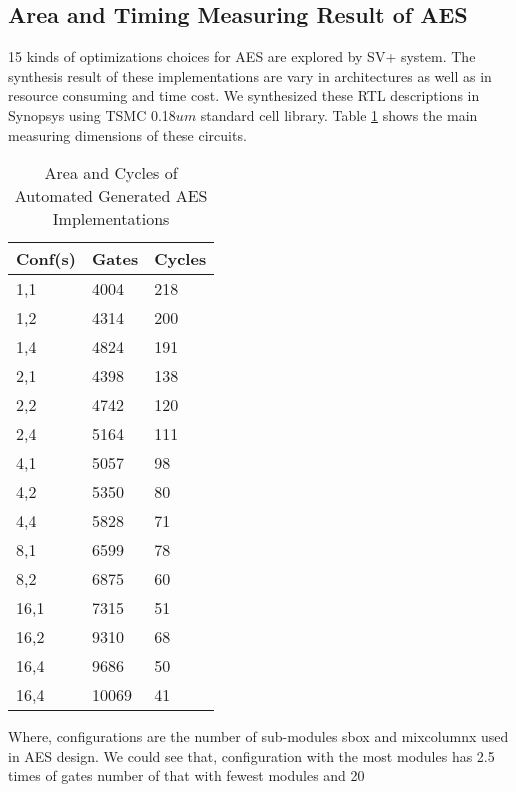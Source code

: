 \documentclass{acm_proc_article-sp}
\begin{document}
\subsection{Area and Timing Measuring Result of AES}
15 kinds of optimizations choices for AES\cite{AES} are explored by SV+ system. The synthesis result of these implementations are vary in architectures as well as in resource consuming and time cost. We synthesized these RTL descriptions in Synopsys using TSMC 0.18$um$ standard cell library. Table \ref{xxxx} shows the main measuring dimensions of these circuits.
\begin{table}[thbp]
\centering
\begin{tabular}{|l|l|l|}\hline
Conf(s) & Gates & Cycles \\ \hline
1,1 & 4004 & 218 \\ \hline
1,2 & 4314 & 200 \\ \hline
1,4 & 4824 & 191 \\ \hline
2,1 & 4398 & 138 \\ \hline
2,2 & 4742 & 120 \\ \hline
2,4 & 5164 & 111 \\ \hline
4,1 & 5057 & 98 \\ \hline
4,2 & 5350 & 80 \\ \hline
4,4 & 5828 & 71 \\ \hline
8,1 & 6599 & 78 \\ \hline
8,2 & 6875 & 60 \\ \hline
16,1 & 7315 & 51 \\ \hline
16,2 & 9310 & 68 \\ \hline
16,4 & 9686 & 50 \\ \hline 
16,4 & 10069 & 41 \\ \hline
\end{tabular}
\caption{Area and Cycles of Automated Generated AES Implementations}
\label{xxxx}
\end{table}
Where, configurations are the number of sub-modules sbox and mixcolumnx used in AES design. We could see that, configuration with the most modules has 2.5 times of gates number of that with fewest modules and 20%

 
\end{document}
